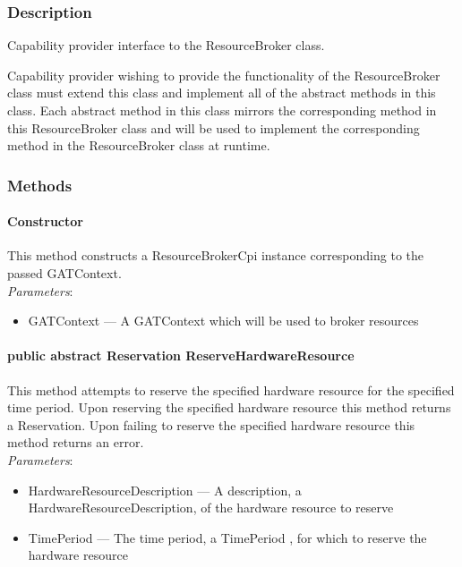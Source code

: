 \documentclass[$Date: 2003/06/26 19:29:31 $]{glabarticle}
\begin{document}

\subsubsection{Description}

Capability provider interface to the ResourceBroker class.

Capability provider wishing to provide the functionality of the ResourceBroker class must extend 
this class and implement all of the abstract methods in this class. Each abstract method in this class 
mirrors the corresponding method in this ResourceBroker class and will be used to implement 
the corresponding method in the ResourceBroker class at runtime. 


\subsubsection{Methods}

\paragraph{Constructor}

This method constructs a ResourceBrokerCpi instance corresponding to the passed GATContext. \\

\textit{Parameters}:
\begin{itemize}
\item[] GATContext --- A GATContext which will be used to broker resources
\end{itemize}

\paragraph{public abstract Reservation ReserveHardwareResource}

This method attempts to reserve the specified hardware resource for the specified time period. Upon
reserving the specified hardware resource this method returns a Reservation. Upon failing to 
reserve the specified hardware resource this method returns an error. \\

\textit{Parameters}:
\begin{itemize}
\item[] HardwareResourceDescription --- A description, a HardwareResourceDescription, of the 
hardware resource to reserve
\item[] TimePeriod --- The time period, a TimePeriod , for which to reserve the hardware resource
\end{itemize}
\end{document}
